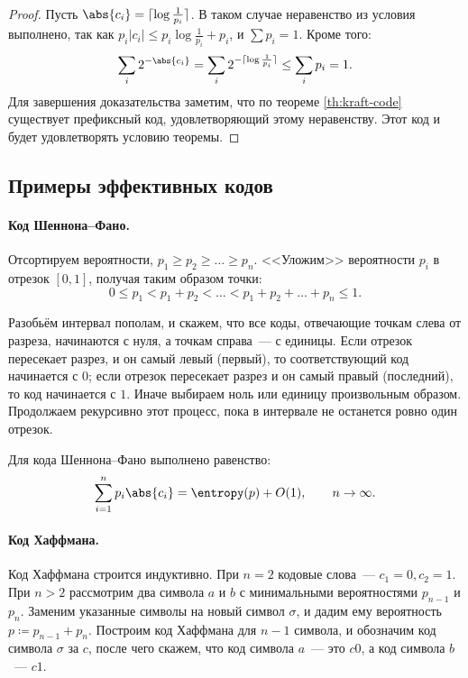 \begin{proof}
    Пусть $\abs{c_i} = \lceil \log\frac{1}{p_i} \rceil$. В таком случае неравенство из условия выполнено,
    так как $p_i|c_i| \leq p_i\log\frac{1}{p_i} + p_i$, и $ \sum p_i = 1$. Кроме того:
    $$
    \sum_i 2^{-\abs{c_i}} = \sum_i 2^{-\lceil \log\frac{1}{p_i}\rceil} \le \sum_i p_i = 1.
    $$
    Для завершения доказательства заметим, что по теореме \ref{th:kraft-code} существует префиксный код,
    удовлетворяющий этому неравенству. Этот код и будет удовлетворять условию теоремы.
\end{proof}


\subsection{Примеры эффективных кодов}

\paragraph{Код Шеннона--Фано.}
Отсортируем вероятности, $ p_1 \ge p_2 \ge \dots \ge p_n$. <<Уложим>> вероятности $p_i$ в отрезок $[0,
1]$, получая таким образом точки:
$$
0 \le p_1 < p_1 + p_2 < \dots < p_1 + p_2 + \dots + p_n \le 1.
$$ 

Разобьём интервал пополам, и скажем, что все коды, отвечающие точкам слева от разреза, начинаются с нуля,
а точкам справа~--- с единицы. Если отрезок пересекает разрез, и он самый левый (первый), то
соответствующий код начинается с $0$; если отрезок пересекает разрез и он самый правый (последний), то
код начинается с $1$. Иначе выбираем ноль или единицу произвольным образом. Продолжаем рекурсивно этот
процесс, пока в интервале не останется ровно один отрезок. 

\begin{exercise}
    Для кода Шеннона--Фано выполнено равенство:
    $$
    \sum_{i = 1}^n p_i\abs{c_i} = \entropy(p) + O(1), \qquad n \to \infty.
    $$
\end{exercise}


\paragraph{Код Хаффмана.} Код Хаффмана строится индуктивно. При $n = 2$ кодовые слова~--- $c_1 = 0, c_2 =
1$. При $n > 2$ рассмотрим два символа $a$ и $b$ с минимальными вероятностями $p_{n - 1}$ и
$p_n$. Заменим указанные символы на новый символ $\sigma$, и дадим ему вероятность $p \coloneqq p_{n - 1}
+ p_n$. Построим код Хаффмана для $n - 1$ символа, и обозначим код символа $\sigma$ за $c$, после чего
скажем, что код символа $a$~--- это $c0$, а код символа $b$~--- $c1$.

